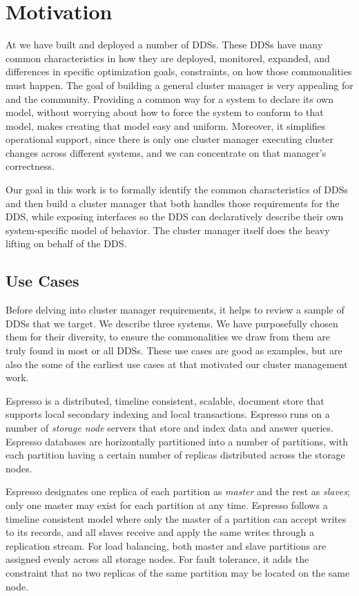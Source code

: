 \section{Motivation}
\label{sec:motivation}
%
At \linkedin we have built and deployed a number of DDSs.
These DDSs have many common characteristics in how
they are deployed, monitored, expanded, \etc and differences in specific optimization goals,
constraints, \etc on how those commonalities must happen.
The goal of building a general cluster manager is very appealing for \linkedin and the community.  
Providing a common way for a system to declare 
its own model, without worrying about how to force the system to conform to that model, makes creating 
that model easy and uniform.  Moreover, it simplifies operational support, since there is only one 
cluster manager executing cluster changes across different systems, and we can concentrate on that 
manager's correctness.

  Our goal in this work is to 
formally identify the common characteristics of DDSs and then build a cluster manager that 
both handles those requirements for the DDS, while exposing interfaces so the DDS can declaratively
describe their own system-specific model of behavior.  The cluster manager
itself does the heavy lifting on behalf of the DDS. 

 

\subsection{Use Cases}
\label{sec:usecases}
%
Before delving into cluster manager requirements, it helps to review a sample of DDSs that we 
target.  We describe three \linkedin systems.  We have purposefully chosen them for their diversity,
to ensure the commonalities we draw from them are truly found in most or all DDSs.  These use cases
are good as examples, but are also the some of the earliest use cases at \linkedin that motivated our 
cluster management work.

Espresso is a distributed, timeline consistent, scalable, document store that 
supports local secondary indexing and local transactions.  Espresso runs on a 
number of \emph{storage node} servers that store and index data and 
answer queries. Espresso databases are horizontally partitioned into a number of partitions, 
with each partition having a certain number of replicas distributed across the 
storage nodes.

Espresso designates one replica of each partition as \emph{master} and the rest as \emph{slaves}; only
one master may exist for each partition at any time.  
Espresso follows a timeline consistent model where only the master of a
partition can accept writes to its records, and all slaves receive and apply the same writes through a replication stream.  For load balancing, both master and slave
partitions are assigned evenly across all storage nodes.  For fault tolerance, it adds the constraint that no   
two replicas of the same partition may be located on the same node.

